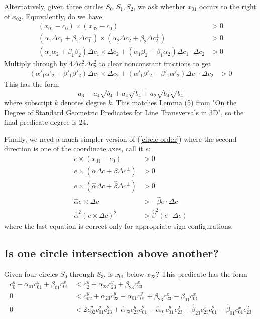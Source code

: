\documentclass[11pt]{article}
\begin{document}
Alternatively, given three circles $S_0, S_1, S_2$, we ask whether $x_{01}$ occurs to the right of $x_{02}$.  Equivalently, do we have
\begin{align*}
(x_{01} - c_0) \times (x_{02} - c_0) &> 0 \\
(\alpha_1 \Delta c_1 + \beta_1 \Delta c_1^\perp) \times (\alpha_2 \Delta c_2 + \beta_2 \Delta c_2^\perp) &> 0 \\
(\alpha_1 \alpha_2 + \beta_1 \beta_2) \Delta c_1 \times \Delta c_2 + (\alpha_1 \beta_2 - \beta_1 \alpha_2) \Delta c_1 \cdot \Delta c_2 &> 0
\end{align*}
Multiply through by $4 \Delta c_1^2 \Delta c_2^2$ to clear nonconstant fractions to get
\begin{align} \label{circle-order}
(\alpha'_1 \alpha'_2 + \beta'_1 \beta'_2) \Delta c_1 \times \Delta c_2 + (\alpha'_1 \beta'_2 - \beta'_1 \alpha'_2) \Delta c_1 \cdot \Delta c_2 &> 0
\end{align}
This has the form
$$a_6 + a_4 \sqrt{b_4} + a_4 \sqrt{b_4} + a_2 \sqrt{b_4} \sqrt{b_4}$$
where subscript $k$ denotes degree $k$.  This matches Lemma (5) from "On the Degree of Standard Geometric Predicates for Line Transversals in 3D", so the final predicate degree is 24.

Finally, we need a much simpler version of (\ref{circle-order}) where the second direction is one of the coordinate axes, call it $e$:
\begin{align*}
e \times (x_{01} - c_0) &> 0 \\
e \times (\alpha \Delta c + \beta \Delta c^\perp) &> 0 \\
e \times (\hat{\alpha} \Delta c + \hat{\beta} \Delta c^\perp) &> 0 \\
\hat{\alpha} e \times \Delta c &> -\hat{\beta} e \cdot \Delta c \\
\hat{\alpha}^2 (e \times \Delta c)^2 &> \hat{\beta}^2 (e \cdot \Delta c)
\end{align*}
where the last equation is correct only for appropriate sign configurations.

\subsection{Is one circle intersection above another?}

Given four circles $S_0$ through $S_3$, is $x_{01}$ below $x_{23}$?  This predicate has the form
\begin{align*}
c_0^y + \alpha_{01} c_{01}^y + \beta_{01} c_{01}^x &< c_2^y + \alpha_{23} c_{23}^y + \beta_{23} c_{23}^x \\
0 &< c_{02}^y + \alpha_{23} c_{23}^y - \alpha_{01} c_{01}^y + \beta_{23} c_{23}^x - \beta_{01} c_{01}^x \\
0 &< 2 c_{02}^y c_{01}^2 c_{23}^2 + \hat{\alpha}_{23} c_{23}^y c_{01}^2 - \hat{\alpha}_{01} c_{01}^y c_{23}^2 + \hat{\beta}_{23} c_{23}^x c_{01}^2 - \hat{\beta}_{01} c_{01}^x c_{23}^2
\end{align*}
\end{document}
